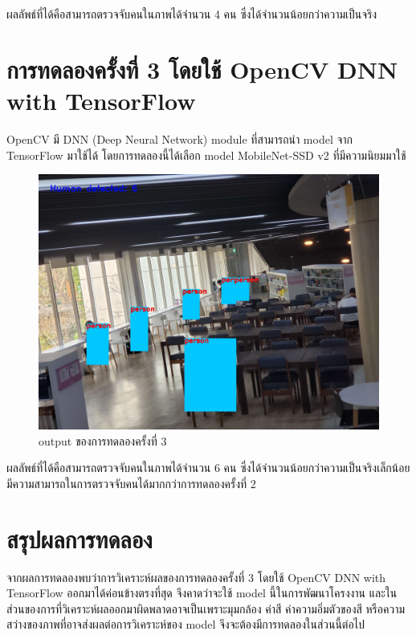 ผลลัพธ์ที่ได้คือสามารถตรวจจับคนในภาพได้จำนวน 4 คน ซึ่งได้จำนวนน้อยกว่าความเป็นจริง
\newpage
\section{การทดลองครั้งที่ 3 โดยใช้ OpenCV DNN with TensorFlow}
\hspace{10mm} OpenCV มี DNN (Deep Neural Network) module ที่สามารถนำ model จาก TensorFlow มาใช้ได้ โดยการทดลองนี้ได้เลือก model MobileNet-SSD v2 ที่มีความนิยมมาใช้\cite{OpenDNN}

\begin{figure}[ht]
    \centering
    \includegraphics[scale=0.25]{images/dnn_output.jpg}
    \caption[output 3]{output ของการทดลองครั้งที่ 3}
    \label{fig:output3}
\end{figure}
ผลลัพธ์ที่ได้คือสามารถตรวจจับคนในภาพได้จำนวน 6 คน ซึ่งได้จำนวนน้อยกว่าความเป็นจริงเล็กน้อย มีความสามารถในการตรวจจับคนได้มากกว่าการทดลองครั้งที่ 2
\section{สรุปผลการทดลอง}
\hspace{10mm} จากผลการทดลองพบว่าการวิเคราะห์ผลของการทดลองครั้งที่ 3 โดยใช้ OpenCV DNN with TensorFlow ออกมาได้ค่อนข้างตรงที่สุด จึงคาดว่าจะใช้ model นี้ในการพัฒนาโครงงาน
และในส่วนของการที่วิเคราะห์ผลออกมาผิดพลาดอาจเป็นเพราะมุมกล้อง ค่าสี ค่าความอิ่มตัวของสี หรือความสว่างของภาพที่อาจส่งผลต่อการวิเคราะห์ของ model จึงจะต้องมีการทดลองในส่วนนี้ต่อไป